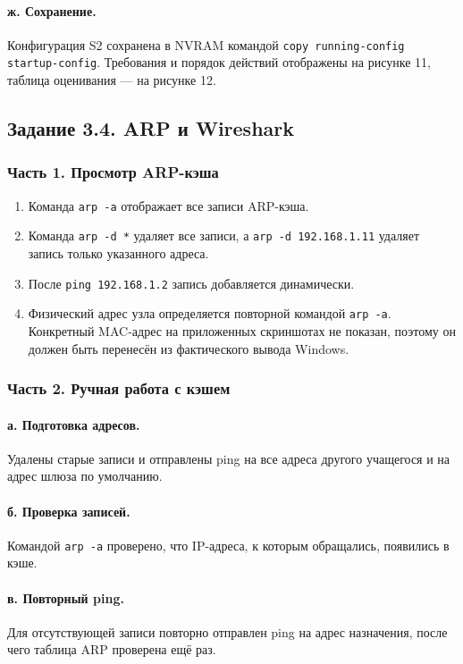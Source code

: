 \documentclass[a4paper,14pt,oneside]{extarticle}
\begin{document}
\paragraph{ж. Сохранение.}
Конфигурация S2 сохранена в NVRAM командой
\texttt{copy running-config startup-config}. Требования и порядок действий
отображены на рисунке 11, таблица оценивания --- на рисунке 12.

\subsection{Задание 3.4. ARP и Wireshark}

\subsubsection{Часть 1. Просмотр ARP-кэша}

\begin{enumerate}[label=\arabic*.]
\item Команда \texttt{arp -a} отображает все записи ARP-кэша.
\item Команда \texttt{arp -d *} удаляет все записи, а
\texttt{arp -d 192.168.1.11} удаляет запись только указанного адреса.
\item После \texttt{ping 192.168.1.2} запись добавляется динамически.
\item Физический адрес узла определяется повторной командой
\texttt{arp -a}. Конкретный MAC-адрес на приложенных скриншотах не показан,
поэтому он должен быть перенесён из фактического вывода Windows.
\end{enumerate}

\subsubsection{Часть 2. Ручная работа с кэшем}

\paragraph{а. Подготовка адресов.}
Удалены старые записи и отправлены ping на все адреса другого учащегося и
на адрес шлюза по умолчанию.

\paragraph{б. Проверка записей.}
Командой \texttt{arp -a} проверено, что IP-адреса, к которым обращались,
появились в кэше.

\paragraph{в. Повторный ping.}
Для отсутствующей записи повторно отправлен ping на адрес назначения, после
чего таблица ARP проверена ещё раз.
\end{document}
